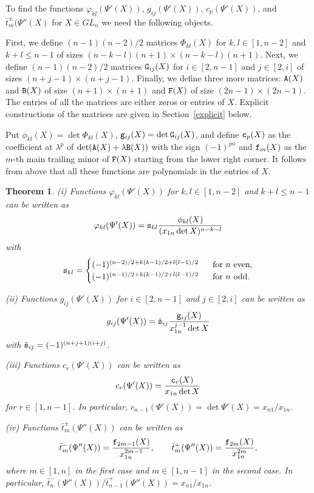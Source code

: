 \documentclass{amsart}
\newtheorem{theorem}{Theorem}
\theoremstyle{definition}
\theoremstyle{remark}
\numberwithin{equation}{section}
\numberwithin{theorem}{section}
\def\NA{{\tt A}}
\def\NB{{\tt B}}
\def\NF{{\tt F}}
\def\NG{{\tt G}}
\def\Nphi{{\mathsf\Phi}}
\def\ec{{\tt c}}
\def\ef{{\tt f}}
\def\eg{{\tt g}}
\def\es{{\tt s}}
\def\esigma{{\tt \sigma}}
\def\fy{\varphi}
\begin{document}
To find the functions $\fy_{kl}(\Psi'(X))$, $g_{ij}(\Psi'(X))$, $c_p(\Psi'(X))$, 
and $\bar t_m^\pm(\Psi''(X)$ for $X\in GL_n$ we need the following objects.

First, we define $(n-1)(n-2)/2$ matrices $\Nphi_{kl}(X)$ for $k,l\in[1,n-2]$ and $k+l\le n-1$ 
of sizes $(n-k-l)(n+1)\times (n-k-l)(n+1)$. Next, we define $(n-1)(n-2)/2$ matrices $\NG_{ij}(X)$ 
for $i\in[2,n-1]$ and $j\in [2,i]$ of sizes $(n+j-1)\times (n+j-1)$. Finally, we define three more matrices:
$\NA(X)$ and $\NB(X)$ of size $(n+1)\times(n+1)$ and $\NF(X)$ of size $(2n-1)\times(2n-1)$. The entries of all the
matrices are either zeros or entries of $X$. Explicit constructions of the matrices are given in Section~\ref{explicit} below.

Put $\phi_{kl}(X)=\det\Nphi_{kl}(X)$, $\eg_{ij}(X)=\det \NG_{ij}(X)$, and define $\ec_p(X)$ as the 
coefficient at $\lambda^p$ of $\det(\NA(X)+\lambda \NB(X))$ with the sign $(-1)^{pn}$ and $\ef_m(X)$ as the $m$-th main trailing minor of $\NF(X)$ starting from the lower right corner. It follows from above that all these functions are polynomials in the entries of $X$.

\begin{theorem}\label{expressions}
{\rm (i)} Functions $\fy_{kl}(\Psi'(X))$ for $k,l\in[1,n-2]$ and $k+l\le n-1$ can be written as
\begin{equation}\label{badphi}
 \fy_{kl}(\Psi'(X))=\es_{kl}\frac{\phi_{kl}(X)}{(x_{1n}\det X)^{n-k-l}}
\end{equation}
with
\[
\es_{kl}=\begin{cases} (-1)^{(n-2)/2 +k(k-1)/2+l(l-1)/2}\ & \ \text{for $n$ even},\\
(-1)^{(n-1)/2+k(k-1)/2+l(l-1)/2}    \ & \ \text{for $n$ odd}.
\end{cases}		
\]


{\rm (ii)} Functions $g_{ij}(\Psi'(X))$ for $i\in[2,n-1]$ and $j\in [2,i]$  can be written as
\begin{equation}\label{badg}
g_{ij}(\Psi'(X))=\hat\es_{ij}\frac{\eg_{ij}(X)}{x_{1n}^{j-1}\det X}
\end{equation}
with $\hat\es_{ij}=(-1)^{(n+j+1)(i+j)}$.

{\rm (iii)}  Functions $c_r(\Psi'(X))$  can be written as
\begin{equation}\label{badc}
c_r(\Psi'(X))=\frac{\ec_r(X)}{x_{1n}\det X}
\end{equation}
for $r\in[1,n-1]$. In particular, $c_{n-1}(\Psi'(X))=\det \Psi'(X)=x_{n1}/x_{1n}$.

{\rm (iv)} Functions $\bar t_m^\pm(\Psi''(X))$  can be written as
\begin{equation}\label{badbart}
\bar t_m^-(\Psi''(X))=\frac{\ef_{2m-1}(X)}{x_{1n}^{2m-1}},\qquad
\bar t_m^+(\Psi''(X))=\frac{\ef_{2m}(X)}{x_{1n}^{2m}},
\end{equation}
where $m\in [1,n]$ in the first case and $m\in [1,n-1]$ in the second case. 
In particular, $\bar t_n^-(\Psi''(X))/\bar t_{n-1}^+(\Psi''(X))=x_{n1}/x_{1n}$.
\end{theorem}
\end{document}
